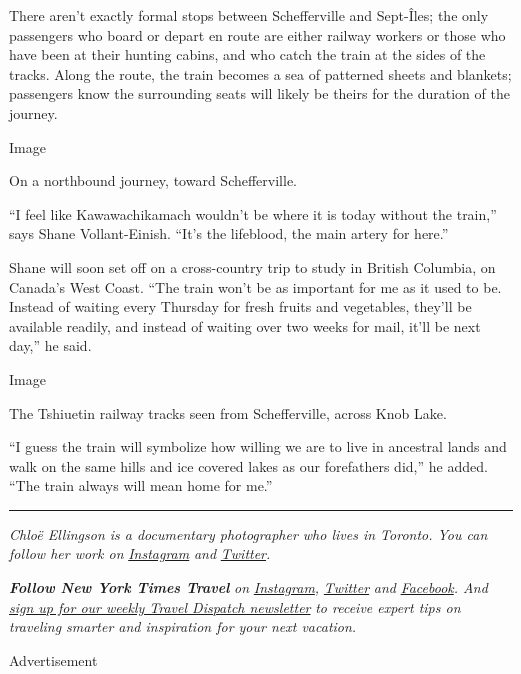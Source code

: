 There aren't exactly formal stops between Schefferville and Sept-Îles;
the only passengers who board or depart en route are either railway
workers or those who have been at their hunting cabins, and who catch
the train at the sides of the tracks. Along the route, the train becomes
a sea of patterned sheets and blankets; passengers know the surrounding
seats will likely be theirs for the duration of the journey.

Image

On a northbound journey, toward Schefferville.

``I feel like Kawawachikamach wouldn't be where it is today without the
train,'' says Shane Vollant-Einish. ``It's the lifeblood, the main
artery for here.''

Shane will soon set off on a cross-country trip to study in British
Columbia, on Canada's West Coast. ``The train won't be as important for
me as it used to be. Instead of waiting every Thursday for fresh fruits
and vegetables, they'll be available readily, and instead of waiting
over two weeks for mail, it'll be next day,'' he said.

Image

The Tshiuetin railway tracks seen from Schefferville, across Knob Lake.

``I guess the train will symbolize how willing we are to live in
ancestral lands and walk on the same hills and ice covered lakes as our
forefathers did,'' he added. ``The train always will mean home for me.''

\begin{center}\rule{0.5\linewidth}{\linethickness}\end{center}

\emph{Chloë Ellingson is a documentary photographer who lives in
Toronto. You can follow her work on}
\href{https://www.instagram.com/chloeellingson/}{\emph{Instagram}}
\emph{and}
\href{https://twitter.com/chloeellingson}{\emph{Twitter}}\emph{.}

\emph{\textbf{Follow New York Times Travel}} \emph{on}
\href{https://www.instagram.com/nytimestravel/}{\emph{Instagram}}\emph{,}
\href{https://twitter.com/nytimestravel}{\emph{Twitter}} \emph{and}
\href{https://www.facebook.com/nytimestravel/}{\emph{Facebook}}\emph{.
And}
\href{https://www.nytimes.com/newsletters/traveldispatch}{\emph{sign up
for our weekly Travel Dispatch newsletter}} \emph{to receive expert tips
on traveling smarter and inspiration for your next vacation.}

Advertisement

